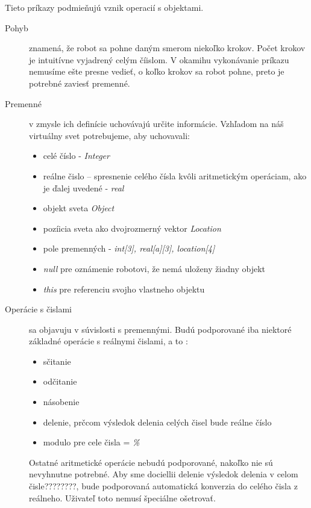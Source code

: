 Tieto príkazy podmieňujú vznik operacií s objektami.
\begin{description}
\item[Pohyb] znamená, že robot sa pohne daným smerom niekoľko krokov. Počet krokov je intuitívne vyjadrený celým číislom. V okamihu vykonávanie  príkazu nemusíme ešte presne vedieť, o koľko krokov sa robot pohne, preto je potrebné zaviesť premenné.
\item[Premenné] v zmysle ich  definície uchovávajú určite informácie. Vzhľadom na náš virtuálny svet potrebujeme, aby uchovavali: %
\begin {itemize}
\item celé číslo - {\it Integer}
\item reálne čislo -- spresnenie celého čísla kvôli aritmetickým operáciam, ako je ďalej uvedené - {\it real}
\item objekt sveta {\it Object}
\item pozíicia sveta ako dvojrozmerný vektor {\it Location}
\item pole premenných - {\it int[3], real[a][3], location[4] } %
\item {\it null} pre oznámenie robotovi, že nemá uloženy žiadny objekt
\item {\it this} pre referenciu svojho vlastneho objektu
\end{itemize}  
\item[Operácie s čislami] sa objavuju v súvislosti s premennými. Budú podporované iba niektoré základné operácie s reálnymi čislami, a to :
\begin{itemize}
\item sčitanie
\item odčitanie
\item násobenie
\item delenie, prčcom výsledok delenia celých čisel bude reálne číslo
\item modulo pre cele čisla = {\it \%}
\end{itemize}
Ostatné aritmetické operácie nebudú podporované, nakoľko nie sú nevyhnutne potrebné. Aby sme dociellii delenie výsledok delenia v celom čisle????????, bude podporovaná automatická konverzia do celého  čisla z reálneho. Uživateľ toto nemusí špeciálne ošetrovať. %

\end{description}
